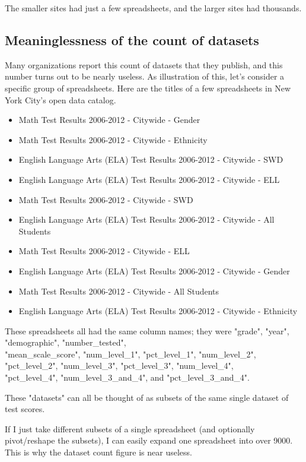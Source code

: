 \documentclass{acm_proc_article-sp}
\begin{document}
The smaller sites had just a few spreadsheets, and the larger sites had thousands.

\subsection{Meaninglessness of the count of datasets} \label{colnames}
Many organizations report this count of datasets that they publish, and this number
turns out to be nearly useless. As illustration of this, let's consider a specific
group of spreadsheets. Here are the titles of a few spreadsheets in New York City's
open data catalog.

\begin{itemize}
\setlength{\itemsep}{0pt}
\item Math Test Results 2006-2012 - Citywide - Gender
\item Math Test Results 2006-2012 - Citywide - Ethnicity
\item English Language Arts (ELA) Test Results 2006-2012 - Citywide - SWD
\item English Language Arts (ELA) Test Results 2006-2012 - Citywide - ELL
\item Math Test Results 2006-2012 - Citywide - SWD
\item English Language Arts (ELA) Test Results 2006-2012 - Citywide - All Students
\item Math Test Results 2006-2012 - Citywide - ELL
\item English Language Arts (ELA) Test Results 2006-2012 - Citywide - Gender
\item Math Test Results 2006-2012 - Citywide - All Students
\item English Language Arts (ELA) Test Results 2006-2012 - Citywide - Ethnicity
\end{itemize}

These spreadsheets all had the same column names; they were
"grade", "year", "demographic", "number\_tested",\\ "mean\_scale\_score", 
"num\_level\_1", "pct\_level\_1", "num\_level\_2", "pct\_level\_2",
"num\_level\_3", "pct\_level\_3", "num\_level\_4",\\ "pct\_level\_4", 
"num\_level\_3\_and\_4", and "pct\_level\_3\_and\_4".

These "datasets" can all be thought of as subsets of the same single dataset
of test scores.

If I just take different subsets of a single spreadsheet (and optionally
pivot/reshape the subsets), I can easily expand one spreadsheet into over 9000.
This is why the dataset count figure is near useless.
\end{document}
